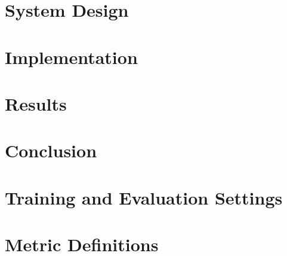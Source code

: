 \documentclass[a4paper, 11pt, oneside]{report}
\begin{document}
\chapter{System Design}


\chapter{Implementation}


\chapter{Results}


\chapter{Conclusion}


\appendix
\chapter{Training and Evaluation Settings}


\chapter{Metric Definitions}




\end{document}
